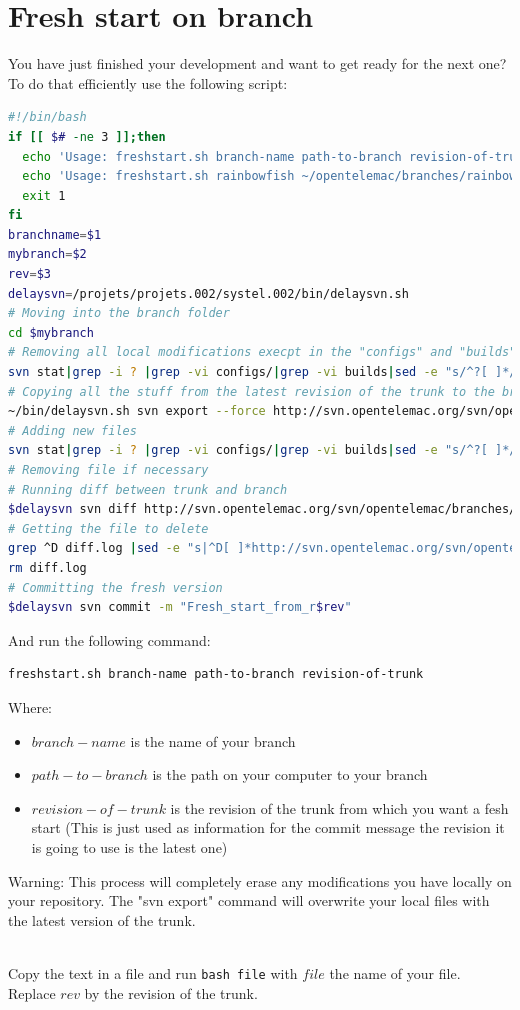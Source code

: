 \section{Fresh start on branch}
%
You have just finished your development and want to get ready for the next one?
%
To do that efficiently use the following script:
\begin{lstlisting}[language=bash]
#!/bin/bash
if [[ $# -ne 3 ]];then
  echo 'Usage: freshstart.sh branch-name path-to-branch revision-of-trunk'
  echo 'Usage: freshstart.sh rainbowfish ~/opentelemac/branches/rainbowfish 6666'
  exit 1
fi
branchname=$1
mybranch=$2
rev=$3
delaysvn=/projets/projets.002/systel.002/bin/delaysvn.sh
# Moving into the branch folder
cd $mybranch
# Removing all local modifications execpt in the "configs" and "builds"folder
svn stat|grep -i ? |grep -vi configs/|grep -vi builds|sed -e "s/^?[ ]*//g"|tr '\n' ' '|xargs rm -rvf
# Copying all the stuff from the latest revision of the trunk to the branch
~/bin/delaysvn.sh svn export --force http://svn.opentelemac.org/svn/opentelemac/trunk .
# Adding new files
svn stat|grep -i ? |grep -vi configs/|grep -vi builds|sed -e "s/^?[ ]*//g"|tr '\n' ' '|xargs svn add
# Removing file if necessary
# Running diff between trunk and branch
$delaysvn svn diff http://svn.opentelemac.org/svn/opentelemac/branches/$branchname http://svn.opentelemac.org/svn/opentelemac/trunk --summarize|tee diff.log
# Getting the file to delete
grep ^D diff.log |sed -e "s|^D[ ]*http://svn.opentelemac.org/svn/opentelemac/branches/${branchname}/||g"|tr '\n' ' '| xargs svn rm
rm diff.log
# Committing the fresh version
$delaysvn svn commit -m "Fresh_start_from_r$rev"
\end{lstlisting}
And run the following command:
\begin{lstlisting}[language=bash]
freshstart.sh branch-name path-to-branch revision-of-trunk
\end{lstlisting}
Where:
\begin{itemize}
\item $branch-name$ is the name of your branch
\item $path-to-branch$ is the path on your computer to your branch
\item $revision-of-trunk$ is the revision of the trunk from which you want a
fesh start (This is just used as information for the commit message the
revision it is going to use is the latest one)
\end{itemize}
%
\begin{WarningBlock}{Warning:}
This process will completely erase any modifications you have locally on your
repository. The "svn export" command will overwrite your local files with the
latest version of the trunk.
\end{WarningBlock}
\\
Copy the text in a file and run \verb!bash file! with $file$ the name of your
file. Replace $rev$ by the revision of the trunk.
%
